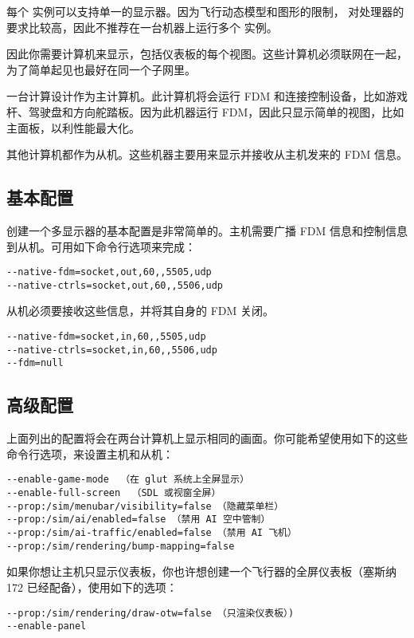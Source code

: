 每个 \FlightGear{} 实例可以支持单一的显示器。因为飞行动态模型和图形的限制，\FlightGear{} 对处理器的要求比较高，因此不推荐在一台机器上运行多个 \FlightGear{} 实例。

因此你需要计算机来显示，包括仪表板的每个视图。这些计算机必须联网在一起，为了简单起见也最好在同一个子网里。

一台计算设计作为主计算机。此计算机将会运行 FDM 和连接控制设备，比如游戏杆、驾驶盘和方向舵踏板。因为此机器运行 FDM，因此只显示简单的视图，比如主面板，以利性能最大化。

其他计算机都作为从机。这些机器主要用来显示并接收从主机发来的 FDM 信息。

\subsection{基本配置}

创建一个多显示器的基本配置是非常简单的。主机需要广播 FDM 信息和控制信息到从机。可用如下命令行选项来完成：

\begin{verbatim}
--native-fdm=socket,out,60,,5505,udp
--native-ctrls=socket,out,60,,5506,udp
\end{verbatim}

从机必须要接收这些信息，并将其自身的 FDM 关闭。

\begin{verbatim}
--native-fdm=socket,in,60,,5505,udp
--native-ctrls=socket,in,60,,5506,udp
--fdm=null
\end{verbatim}

\subsection{高级配置}

上面列出的配置将会在两台计算机上显示相同的画面。你可能希望使用如下的这些命令行选项，来设置主机和从机：

\begin{verbatim}
--enable-game-mode  （在 glut 系统上全屏显示）
--enable-full-screen  （SDL 或视窗全屏）
--prop:/sim/menubar/visibility=false （隐藏菜单栏）
--prop:/sim/ai/enabled=false （禁用 AI 空中管制）
--prop:/sim/ai-traffic/enabled=false （禁用 AI 飞机）
--prop:/sim/rendering/bump-mapping=false
\end{verbatim}

如果你想让主机只显示仪表板，你也许想创建一个飞行器的全屏仪表板（塞斯纳 172 已经配备），使用如下的选项：

\begin{verbatim}
--prop:/sim/rendering/draw-otw=false （只渲染仪表板）)
--enable-panel
\end{verbatim}

